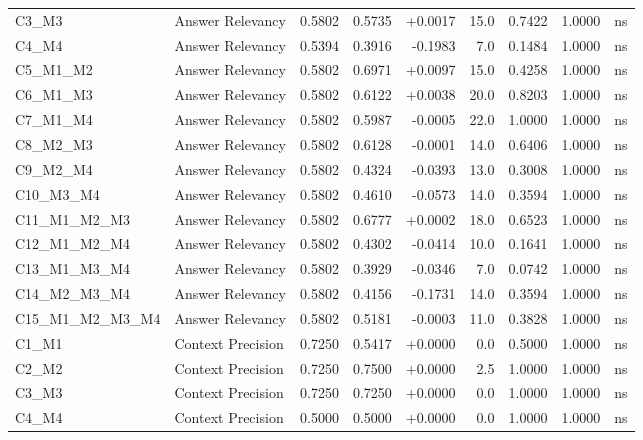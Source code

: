 \begin{table}[p]
\begin{tabular*}{\textwidth}{@{\extracolsep{\fill}} l l r r r r r r c @{}}
\addlinespace
C3\_M3          & Answer Relevancy     & 0.5802 & 0.5735 & +0.0017 & 15.0 & 0.7422 & 1.0000 & ns \\
\addlinespace
C4\_M4          & Answer Relevancy     & 0.5394 & 0.3916 & -0.1983 & 7.0 & 0.1484 & 1.0000 & ns \\
\addlinespace
C5\_M1\_M2      & Answer Relevancy     & 0.5802 & 0.6971 & +0.0097 & 15.0 & 0.4258 & 1.0000 & ns \\
\addlinespace
C6\_M1\_M3      & Answer Relevancy     & 0.5802 & 0.6122 & +0.0038 & 20.0 & 0.8203 & 1.0000 & ns \\
\addlinespace
C7\_M1\_M4      & Answer Relevancy     & 0.5802 & 0.5987 & -0.0005 & 22.0 & 1.0000 & 1.0000 & ns \\
\addlinespace
C8\_M2\_M3      & Answer Relevancy     & 0.5802 & 0.6128 & -0.0001 & 14.0 & 0.6406 & 1.0000 & ns \\
\addlinespace
C9\_M2\_M4      & Answer Relevancy     & 0.5802 & 0.4324 & -0.0393 & 13.0 & 0.3008 & 1.0000 & ns \\
\addlinespace
C10\_M3\_M4     & Answer Relevancy     & 0.5802 & 0.4610 & -0.0573 & 14.0 & 0.3594 & 1.0000 & ns \\
\addlinespace
C11\_M1\_M2\_M3 & Answer Relevancy     & 0.5802 & 0.6777 & +0.0002 & 18.0 & 0.6523 & 1.0000 & ns \\
\addlinespace
C12\_M1\_M2\_M4 & Answer Relevancy     & 0.5802 & 0.4302 & -0.0414 & 10.0 & 0.1641 & 1.0000 & ns \\
\addlinespace
C13\_M1\_M3\_M4 & Answer Relevancy     & 0.5802 & 0.3929 & -0.0346 & 7.0 & 0.0742 & 1.0000 & ns \\
\addlinespace
C14\_M2\_M3\_M4 & Answer Relevancy     & 0.5802 & 0.4156 & -0.1731 & 14.0 & 0.3594 & 1.0000 & ns \\
\addlinespace
C15\_M1\_M2\_M3\_M4 & Answer Relevancy     & 0.5802 & 0.5181 & -0.0003 & 11.0 & 0.3828 & 1.0000 & ns \\
\addlinespace
C1\_M1          & Context Precision    & 0.7250 & 0.5417 & +0.0000 & 0.0 & 0.5000 & 1.0000 & ns \\
\addlinespace
C2\_M2          & Context Precision    & 0.7250 & 0.7500 & +0.0000 & 2.5 & 1.0000 & 1.0000 & ns \\
\addlinespace
C3\_M3          & Context Precision    & 0.7250 & 0.7250 & +0.0000 & 0.0 & 1.0000 & 1.0000 & ns \\
\addlinespace
C4\_M4          & Context Precision    & 0.5000 & 0.5000 & +0.0000 & 0.0 & 1.0000 & 1.0000 & ns \\

\end{tabular*}
\end{table}
